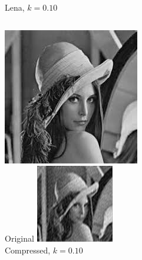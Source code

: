 \documentclass[12pt]{beamer}
\begin{document}
\begin{frame}{Lena, \(k=0.10\)}
  \begin{columns}
      \includegraphics[width=\textwidth]{Lena.jpeg}\\
      \footnotesize Original
      \includegraphics[width=\textwidth]{Lena_k10.png}\\
      \footnotesize Compressed, \(k=0.10\)
  \end{columns}
\end{frame}
\end{document}

